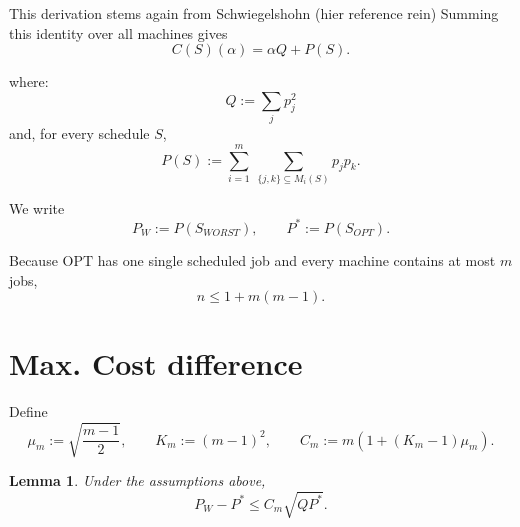 \documentclass[11pt]{article}
\newtheorem{lemma}{Lemma}
\begin{document}
This derivation stems again from Schwiegelshohn (hier reference rein)
Summing this identity over all machines gives
\[
 C(S)(\alpha)=\alpha Q+P(S).
\tag{1}
\]

where: 
\[
 Q:=\sum_jp_j^2
\]
and, for every schedule \(S\),
\[
 P(S):=
 \sum_{i=1}^m\ \sum_{\{j,k\}\subseteq M_i(S)}p_jp_k.
\]

 We write
\[
 P_{W}:=P(S_{WORST}),\qquad P^*:=P(S_{OPT}).
\]

Because \(\mathrm{OPT}\) has one single scheduled job and every machine
contains at most \(m\) jobs,
\[
 n\le 1+m(m-1).
\tag{2}
\]

\section{Max. Cost difference}

Define
\[
 \mu_m:=\sqrt{\frac{m-1}{2}},
 \qquad
 K_m:=(m-1)^2,
 \qquad
 C_m:=m\left(1+(K_m-1)\mu_m\right).
\]

\begin{lemma}
\label{lemma: P_W-P*}
Under the assumptions above,
\[
 P_{W}-P^*\le C_m\sqrt{QP^*}.
\tag{3}
\]
\end{lemma}
\end{document}
